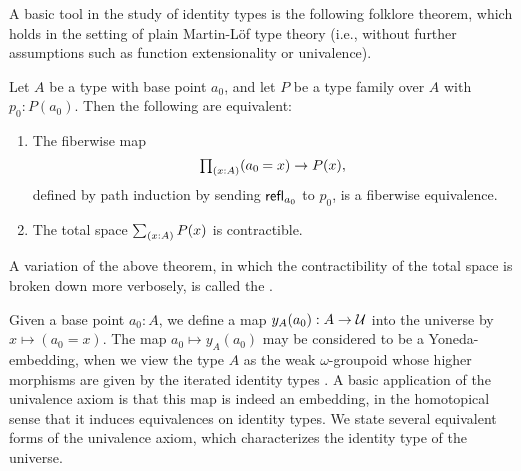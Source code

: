 \documentclass[reqno]{amsart}
\begin{document}
A basic tool in the study of identity types is the following
folklore theorem, which holds in the setting of plain Martin-L\"of type theory (i.e., without
further assumptions such as function extensionality or univalence).

\begin{thm}\label{thm:encode-decode}
Let $A$ be a type with base point $a_0$, and let $P$ be a type family
over $A$ with $p_0:P(a_0)$. Then the following are equivalent:
\begin{enumerate}
\item The fiberwise map
\begin{equation*}
\prd{x:A} (\id{a_0}{x})\to P(x),
\end{equation*}
defined by path induction by sending $\mathsf{refl}_{a_0}$ to $p_0$, is a fiberwise equivalence.
\item The total space $\sm{x:A}P(x)$ is contractible.
\end{enumerate}
\end{thm}

A variation of the above theorem, in which the contractibility of the total space
is broken down more verbosely, is called the 
\cite{LicataShulman}.

Given a base point $a_0:A$, we define a map $y_A(a_0):A\to\mathcal{U}$ into the universe by $x\mapsto (a_0=x)$. 
The map $a_0\mapsto y_A(a_0)$ may be considered to be a Yoneda-embedding, when
we view the type $A$ as the weak $\omega$-groupoid whose higher morphisms are
given by the iterated identity types \cite{VanDenBergGarner,Lumsdaine10}.
A basic application of the univalence axiom is that this map is indeed an embedding, in the homotopical sense that it induces equivalences on identity types.
We state several equivalent forms of the univalence axiom, which characterizes the identity type of the universe.
\end{document}
